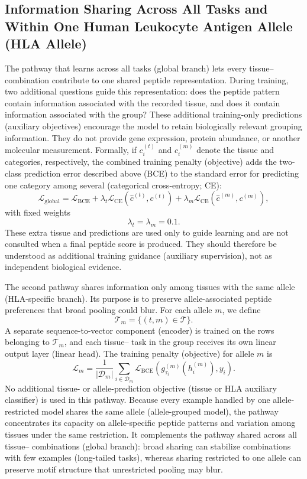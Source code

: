 \subsection{Information Sharing Across All Tasks and Within One Human Leukocyte Antigen Allele (HLA Allele)}

The pathway that learns across all tasks (global branch) lets every tissue--\plainHLA{} combination contribute to one shared peptide representation. During training, two additional questions guide this representation: does the peptide pattern contain information associated with the recorded tissue, and does it contain information associated with the \plainHLA{} group? These additional training-only predictions (auxiliary objectives) encourage the model to retain biologically relevant grouping information. They do not provide gene expression, protein abundance, or another molecular measurement. Formally, if \(c_i^{(t)}\) and \(c_i^{(m)}\) denote the tissue and \plainHLA{} categories, respectively, the combined training penalty (objective) adds the two-class prediction error described above (BCE) to the standard error for predicting one category among several (categorical cross-entropy; CE):
\[
\mathcal{L}_{\mathrm{global}}
=
\mathcal{L}_{\mathrm{BCE}}
+
\lambda_t
\mathcal{L}_{\mathrm{CE}}
\left(
\widehat{c}^{(t)},c^{(t)}
\right)
+
\lambda_m
\mathcal{L}_{\mathrm{CE}}
\left(
\widehat{c}^{(m)},c^{(m)}
\right),
\]
with fixed weights
\[
\lambda_t=\lambda_m=0.1.
\]
These extra tissue and \plainHLA{} predictions are used only to guide learning and are not consulted when a final peptide score is produced. They should therefore be understood as additional training guidance (auxiliary supervision), not as independent biological evidence.

The second pathway shares information only among tissues with the same \plainHLA{} allele (HLA-specific branch). Its purpose is to preserve allele-associated peptide preferences that broad pooling could blur. For each \plainHLA{} allele \(m\), we define
\[
\mathcal{T}_m
=
\{(t,m)\in\mathcal{T}\}.
\]
A separate sequence-to-vector component (encoder) is trained on the rows belonging to \(\mathcal{T}_m\), and each tissue--\plainHLA{} task in the group receives its own linear output layer (linear head). The training penalty (objective) for allele \(m\) is
\[
\mathcal{L}_{m}
=
\frac{1}{|\mathcal{D}_m|}
\sum_{i\in\mathcal{D}_m}
\mathcal{L}_{\mathrm{BCE}}
\left(
g^{(m)}_{\tau_i}(h_i^{(m)}),y_i
\right).
\]
No additional tissue- or allele-prediction objective (tissue or HLA auxiliary classifier) is used in this pathway. Because every example handled by one allele-restricted model shares the same allele (allele-grouped model), the pathway concentrates its capacity on allele-specific peptide patterns and variation among tissues under the same \plainHLA{} restriction. It complements the pathway shared across all tissue--\plainHLA{} combinations (global branch): broad sharing can stabilize combinations with few examples (long-tailed tasks), whereas sharing restricted to one \plainHLA{} allele can preserve motif structure that unrestricted pooling may blur.

